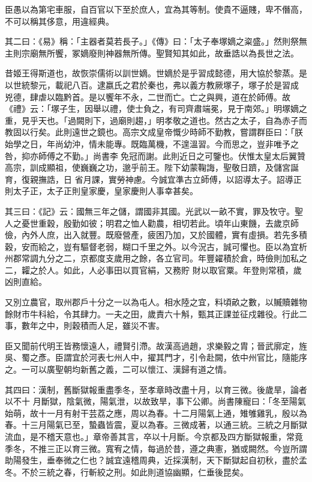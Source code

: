 \begin{pinyinscope}
 臣愚以為第宅車服，自百官以下至於庶人，宜為其等制。使貴不逼賤，卑不僭高，不可以稱其侈意，用違經典。



 其二曰：《易》稱：「主器者莫若長子。」《傳》曰：「太子奉塚嫡之粢盛。」然則祭無主則宗廟無所饗，冢嫡廢則神器無所傳。聖賢知其如此，故垂誥以為長世之法。



 昔姬王得斯道也，故恢崇儒術以訓世嫡。世嫡於是乎習成懿德，用大協於黎蒸。是以世統黎元，載祀八百。逮嬴氏之君於秦也，弗以義方教厥塚子，塚子於是習成
 兇德，肆虐以臨黔首。是以饗年不永，二世而亡。亡之與興，道在於師傅。故《禮》云：「塚子生，因舉以禮，使士負之，有司齊肅端冕，見于南郊。」明塚嫡之重，見乎天也。「過闕則下，過廟則趨，」明孝敬之道也。然古之太子，自為赤子而教固以行矣。此則遠世之鏡也。高宗文成皇帝慨少時師不勤教，嘗謂群臣曰：「朕始學之日，年尚幼沖，情未能專。既臨萬機，不遑溫習。今而思之，豈非唯予之咎，抑亦師傅之不勤。」尚書李免冠而謝。此則近日之可鑒也。伏惟太皇太后翼贊高宗，訓成顯祖，使巍巍之功，邈乎前王。陛下幼蒙鞠誨，聖敬日躋，及儲宮誕育，復親撫誥，日
 省月課，實勞神慮。今誠宜準古立師傅，以詔導太子。詔導正則太子正，太子正則皇家慶，皇家慶則人事幸甚矣。



 其三曰：《記》云：國無三年之儲，謂國非其國。光武以一畝不實，罪及牧守。聖人之憂世重穀，殷勤如彼；明君之恤人勸農，相切若此。頃年山東饑，去歲京師儉，內外人庶，出入就豐。既廢營產，疲困乃加，又於國體，實有虛損。若先多積穀，安而給之，豈有驅督老弱，糊口千里之外。以今況古，誠可懼也。臣以為宜析州郡常調九分之二，京都度支歲用之餘，各立官司。年豐糴積於倉，時儉則加私之二，糶之於人。如此，人必事田以買官絹，又務貯
 財以取官粟。年登則常積，歲凶則直給。



 又別立農官，取州郡戶十分之一以為屯人。相水陸之宜，料頃畝之數，以贓贖雜物餘財市牛科給，令其肆力。一夫之田，歲責六十斛，甄其正課並征戍雜役。行此二事，數年之中，則穀積而人足，雖災不害。



 臣又聞前代明王皆務懷遠人，禮賢引滯。故漢高過趙，求樂毅之胄；晉武廓定，旌吳、蜀之彥。臣謂宜於河表七州人中，擢其門才，引令赴闕，依中州官比，隨能序之。一可以廣聖朝均新舊之義，二可以懷江、漢歸有道之情。



 其四曰：漢制，舊斷獄報重盡季冬，至孝章時改盡十月，以育三微。後歲旱，論者以不十
 月斷獄，陰氣微，陽氣泄，以故致旱，事下公卿。尚書陳寵曰：「冬至陽氣始萌，故十一月有射干芸荔之應，周以為春。十二月陽氣上通，雉雊雞乳，殷以為春。十三月陽氣已至，蟄蟲皆震，夏以為春。三微成著，以通三統。三統之月斷獄流血，是不稽天意也。」章帝善其言，卒以十月斷。今京都及四方斷獄報重，常竟季冬，不推三正以育三微。寬宥之情，每過於昔，遵之典憲，猶或闕然。今豈所謂助陽發生，垂奉微之仁也？誠宜遠稽周典，近採漢制，天下斷獄起自初秋，盡於孟冬。不於三統之春，行斬絞之刑。如此則道協幽顯，仁垂後昆矣。




\end{pinyinscope}
